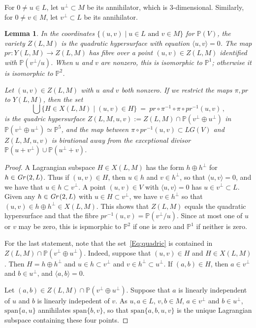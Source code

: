 \documentclass[12pt]{amsart}
\newtheorem{Lemma}[Theorem]{Lemma}
\theoremstyle{remark}
\newcommand{\Gr}{\textit{Gr\,}}
\newcommand{\LG}{\textit{LG}}
\newcommand{\pr}{\textit{pr}}
\newcommand{\Span}{\textrm{span}}
\newcommand{\PP}{{\mathbb P}}
\begin{document}
For $0\neq u\in L$, let $u^\perp \subset M$ be its annihilator, which is 3-dimensional.
Similarly, for $0\neq v\in M$, let $v^\perp\subset L$ be its annihilator.


\begin{Lemma}
  \label{L:quadrics}
  In the coordinates $\{(u,v)\mid u\in L\mbox{ and }v\in M\}$ for $\PP(V)$, the variety $Z(L,M)$ is the quadratic hypersurface with 
  equation $\langle u,v\rangle = 0$.
  The map $\pr\colon Y(L,M)\to Z(L,M)$ has fibre over a point $(u,v)\in Z(L,M)$ identified with $\PP(v^\perp/u)$.
  When $u$ and $v$ are nonzero, this is isomorphic to $\PP^1$; otherwise it is isomorphic to $\PP^2$.
  
  Let $(u,v)\in Z(L,M)$ with $u$ and $v$ both nonzero.
  If we restrict the maps $\pi,\pr$ to $Y(L,M)$, then the set
%
  \begin{equation}
  \label{Eq:quadric}
     \bigcup\{ H\in X(L,M)\mid (u,v)\in H\}\ =\ \pr \circ \pi^{-1} \circ \pi \circ \pr^{-1}(u,v)\,,
  \end{equation}
%
  is the quadric hypersurface $Z(L,M,u,v):=Z(L,M)\cap \PP(v^\perp\oplus u^\perp)$ in $\PP(v^\perp\oplus u^\perp)\simeq\PP^5$, and the map
  between $\pi \circ \pr^{-1}(u,v) \subset\LG(V)$ and $Z(L,M,u,v)$ is birational away from the exceptional divisor
  $\PP(u + v^\perp) \cup \PP(u^\perp+v)$.
\end{Lemma}
\begin{proof}
  A Lagrangian subspace $H\in X(L,M)$ has the form $h\oplus h^\perp$ for $h\in\Gr(2,L)$.
  Thus if $(u,v)\in H$, then $u\in h$ and $v\in h^\perp$, so that $\langle u,v\rangle=0$,
  and we have that $u\in h\subset v^\perp$.
  A point $(u,v)\in V$ with  $\langle u,v\rangle=0$ has $u\in v^\perp \subset L$.
  Given any $h\in\Gr(2,L)$ with $u\in H\subset v^\perp$, we have $v\in h^\perp$ so that
  $(u,v)\in h\oplus h^\perp \in X(L,M)$.
  This shows that $Z(L,M)$ equals the quadratic hypersurface and that the fibre $\pr^{-1}(u,v)=\PP(v^\perp/u)$.
  Since at most one of $u$ or $v$ may be zero, this is ispmorphic to $\PP^2$ if one is zero and $\PP^1$ if neither is zero.

  For the last statement, note that the set~\eqref{Eq:quadric} is contained in $Z(L,M)\cap \PP(v^\perp\oplus u^\perp)$.
  Indeed, suppose that $(u,v)\in H$ and $H\in X(L,M)$.
  Then $H=h\oplus h^\perp$ and $u\in h\subset v^\perp$ and $v\in h^\perp\subset u^\perp$.
  If $(a,b)\in H$, then $a\in v^\perp$ and $b\in u^\perp$, and $\langle a,b\rangle = 0$.
  
  Let $(a,b)\in Z(L,M)\cap \PP(v^\perp\oplus u^\perp)$.
  Suppose that $a$ is linearly independent of $u$ and $b$ is linearly indepedent of $v$.
  As $u,a\in L$, $v,b\in M$, $a\in v^\perp$ and $b\in u^\perp$,
  $\Span\{a,u\}$ annihilates $\Span\{b,v\}$, so that $\Span\{a,b,u,v\}$ is the unique Lagrangian subspace containing these four 
  points. 
\end{proof}
\end{document}
